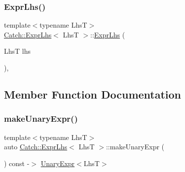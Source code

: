 \subsubsection{\texorpdfstring{ExprLhs()}{ExprLhs()}}
{\footnotesize\ttfamily template$<$typename LhsT$>$ \\
\mbox{\hyperlink{class_catch_1_1_expr_lhs}{Catch\+::\+Expr\+Lhs}}$<$ LhsT $>$\+::\mbox{\hyperlink{class_catch_1_1_expr_lhs}{Expr\+Lhs}} (\begin{DoxyParamCaption}\item[{LhsT}]{lhs }\end{DoxyParamCaption})\hspace{0.3cm}{\ttfamily [inline]}, {\ttfamily [explicit]}}



\subsection{Member Function Documentation}
\mbox{\label{class_catch_1_1_expr_lhs_ab68bd6d5d3ae21b7fba9010150fba95d}} 
\subsubsection{\texorpdfstring{makeUnaryExpr()}{makeUnaryExpr()}}
{\footnotesize\ttfamily template$<$typename LhsT$>$ \\
auto \mbox{\hyperlink{class_catch_1_1_expr_lhs}{Catch\+::\+Expr\+Lhs}}$<$ LhsT $>$\+::make\+Unary\+Expr (\begin{DoxyParamCaption}{ }\end{DoxyParamCaption}) const -\/$>$ \mbox{\hyperlink{class_catch_1_1_unary_expr}{Unary\+Expr}}$<$LhsT$>$ \hspace{0.3cm}{\ttfamily [inline]}}

\mbox{\label{class_catch_1_1_expr_lhs_af4c6b85fb0d089fcf55d961e1efed5ea}} 
